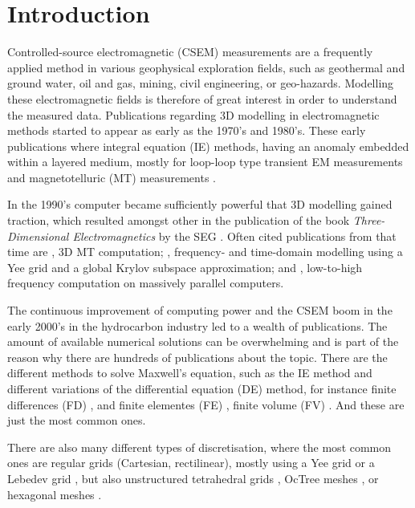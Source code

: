 \documentclass[
    paper,
  ]{geophysics}
\begin{document}
\section{Introduction}

Controlled-source electromagnetic (CSEM) measurements are a frequently applied
method in various geophysical exploration fields, such as geothermal and ground
water, oil and gas, mining, civil engineering, or geo-hazards. Modelling these
electromagnetic fields is therefore of great interest in order to understand
the measured data. Publications regarding 3D modelling in electromagnetic
methods started to appear as early as the 1970's and 1980's. These early
publications where integral equation (IE) methods, having an anomaly embedded
within a layered medium, mostly for loop-loop type transient EM measurements
\citep{GJI.74.Raiche, GEO.75.Hohmann, GJI.82.Das, GEO.86.Newman} and
magnetotelluric (MT) measurements \citep{GEO.84.Wannamaker}.

In the 1990's computer became sufficiently powerful that 3D modelling gained
traction, which resulted amongst other in the publication of the book
\emph{Three-Dimensional Electromagnetics} by the SEG
\citep{B.SEG.99.Oristaglio}. Often cited publications from that time are
\cite{RSC.94.Mackie}, 3D MT computation; \cite{RS.94.Druskin}, frequency- and
time-domain modelling using a Yee grid and a global Krylov subspace
approximation; and \cite{RS.96.Alumbaugh, GJI.97.Newman}, low-to-high frequency
computation on massively parallel computers.

The continuous improvement of computing power and the CSEM boom in the early
2000's in the hydrocarbon industry led to a wealth of publications. The amount
of available numerical solutions can be overwhelming and is part of the reason
why there are hundreds of publications about the topic. There are the different
methods to solve Maxwell's equation, such as the IE method
\citep{GJI.74.Raiche, RS.02.Hursan, GEO.06.Zhdanov, GP.10.Tehrani,
CAG.16.Kruglyakov, MGS.17.Kruglyakov} and different variations of the
differential equation (DE) method, for instance finite differences (FD)
\citep{IEEE.66.Yee, GEO.93.Wang, RSC.94.Mackie, RS.94.Druskin, GEO.09.Streich,
CAG.13.Sommer}, and finite elementes (FE) \citep{GJI.11.Schwarzbach,
GEO.04.Commer, GEO.12.daSilva, GJI.13.Puzyrev, GJI.13.Grayver, SEG.16.Zhang},
finite volume (FV) \citep{EM.90.Madsen, ECP.07.Haber, GEO.14.Jahandari,
PIER.01.Clemens, GP.06.Mulder}. And these are just the most common ones.

There are also many different types of discretisation, where the most common
ones are regular grids (Cartesian, rectilinear), mostly using a Yee grid
\citep{IEEE.66.Yee} or a Lebedev grid \citep{CMMP.64.Lebedev}, but also
unstructured tetrahedral grids \citep{SEG.16.Zhang, CAG.17.Cai}, OcTree meshes
\citep{ECP.07.Haber}, or hexagonal meshes \citep{CAG.14.Cai}.
\end{document}
